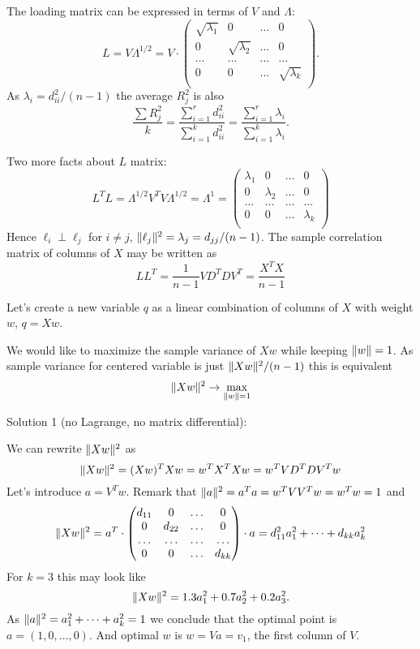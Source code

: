 \documentclass[12pt]{article}
\DeclarePairedDelimiter{\norm}{\lVert}{\rVert}
\begin{document}
The loading matrix can be expressed in terms of $V$ and $\Lambda$:
\[
L = V \Lambda^{1/2} = V \cdot \begin{pmatrix}
    \sqrt{\lambda_1 } & 0 & \dots & 0 \\
    0  & \sqrt{\lambda_2} & \dots & 0 \\
    \dots & \dots & \dots & \dots \\
    0 & 0 & \dots & \sqrt{\lambda_k} \\
\end{pmatrix}.
\]
As $\lambda_i = d_{ii}^2 / (n-1)$ the average $R^2_j$ is also 
\[
\frac{\sum R_j^2}{k} =  \frac{\sum_{i=1}^r d_{ii}^2}{\sum_{i=1}^k d_{ii}^2} =  \frac{\sum_{i=1}^r \lambda_i}{\sum_{i=1}^k \lambda_i} .
\]

Two more facts about $L$ matrix:
\[
L^T L = \Lambda^{1/2} V^T V \Lambda^{1/2} = \Lambda^1 =  \begin{pmatrix}
    \lambda_1 & 0 & \dots & 0 \\
    0  & \lambda_2 & \dots & 0 \\
    \dots & \dots & \dots & \dots \\
    0 & 0 & \dots & \lambda_k \\
\end{pmatrix}
\]
Hence $\ell_i \perp \ell_j$ for $i \neq j$, $\norm{\ell_j}^2= \lambda_j = d_{jj} / (n - 1)$.
The sample correlation matrix of columns of $X$ may be written as
\[
LL^T = \frac{1}{n-1}V D^T D V^T = \frac{X^TX}{n - 1}
\]


Let's create a new variable $q$ as a linear combination of columns of $X$ with weight $w$, $q = Xw$.

We would like to maximize the sample variance of $Xw$ while keeping $\norm{w} = 1$.
As sample variance for centered variable is just $\norm{Xw}^2 / (n - 1)$
this is equivalent
\[
\norm{Xw}^2  \to \max_{\norm{w} = 1}
\]

Solution 1 (no Lagrange, no matrix differential):

We can rewrite $\norm{Xw}^2$ as
\[
\norm{Xw}^2 = (Xw)^T Xw = w^T X^T Xw = w^T VD^T DV^T w
\]
Let's introduce $a = V^T w$.
Remark that $\norm{a}^2 = a^T a = w^T VV^T w = w^T w = 1$ and
\[
    \norm{Xw}^2 = a^T \cdot \begin{pmatrix}
        d_{11} & 0 & \dots & 0 \\
        0  & d_{22} & \dots & 0 \\
        \dots & \dots & \dots & \dots \\
        0 & 0 & \dots & d_{kk} \\
    \end{pmatrix} \cdot a
    = d_{11}^2 a_1^2 + \dots + d_{kk} a_k^2
\]
For $k = 3$ this may look like
\[
    \norm{Xw}^2 = 1.3 a_1^2 + 0.7 a_2^2 + 0.2 a_3^2.
\]
As $\norm{a}^2 = a_1^2 + \dots + a_k^2 = 1$ we conclude that the optimal point is $a = (1, 0, \dots, 0)$. 
And optimal $w$ is $w = Va = v_1$, the first column of $V$.
\end{document}

